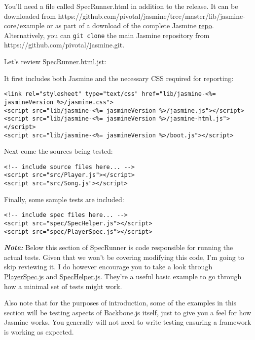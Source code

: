 \documentclass[9pt]{book}
\begin{document}
You'll need a file called SpecRunner.html in addition to the release. It
can be downloaded from
https://github.com/pivotal/jasmine/tree/master/lib/jasmine-core/example
or as part of a download of the complete Jasmine
\href{https://github.com/pivotal/jasmine/zipball/master}{repo}.
Alternatively, you can \texttt{git clone} the main Jasmine repository
from https://github.com/pivotal/jasmine.git.

Let's review
\href{https://github.com/pivotal/jasmine/blob/master/lib/templates/SpecRunner.html.jst}{SpecRunner.html.jst}:

It first includes both Jasmine and the necessary CSS required for
reporting:

\begin{verbatim}
<link rel="stylesheet" type="text/css" href="lib/jasmine-<%= jasmineVersion %>/jasmine.css">
<script src="lib/jasmine-<%= jasmineVersion %>/jasmine.js"></script>
<script src="lib/jasmine-<%= jasmineVersion %>/jasmine-html.js"></script>
<script src="lib/jasmine-<%= jasmineVersion %>/boot.js"></script>
\end{verbatim}

Next come the sources being tested:

\begin{verbatim}
<!-- include source files here... -->
<script src="src/Player.js"></script>
<script src="src/Song.js"></script>
\end{verbatim}

Finally, some sample tests are included:

\begin{verbatim}
<!-- include spec files here... -->
<script src="spec/SpecHelper.js"></script>
<script src="spec/PlayerSpec.js"></script>
\end{verbatim}

\textbf{\emph{Note:}} Below this section of SpecRunner is code
responsible for running the actual tests. Given that we won't be
covering modifying this code, I'm going to skip reviewing it. I do
however encourage you to take a look through
\href{https://github.com/pivotal/jasmine/blob/master/lib/jasmine-core/example/spec/PlayerSpec.js}{PlayerSpec.js}
and
\href{https://github.com/pivotal/jasmine/blob/master/lib/jasmine-core/example/spec/SpecHelper.js}{SpecHelper.js}.
They're a useful basic example to go through how a minimal set of tests
might work.

Also note that for the purposes of introduction, some of the examples in
this section will be testing aspects of Backbone.js itself, just to give
you a feel for how Jasmine works. You generally will not need to write
testing ensuring a framework is working as expected.
\end{document}
